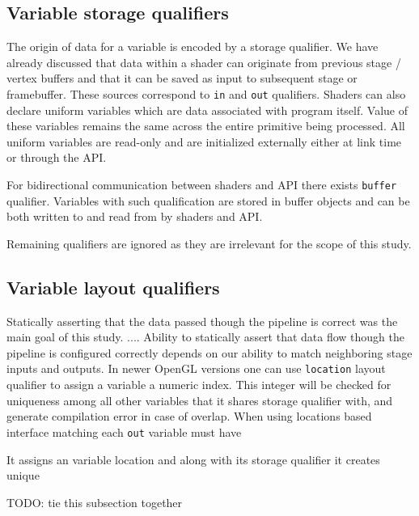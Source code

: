 \subsection{Variable storage qualifiers}

The origin of data for a variable is encoded by a storage qualifier. We have already discussed that data within a shader can originate from previous stage / vertex buffers and that it can be saved as input to subsequent stage or framebuffer.
These sources correspond to \texttt{in} and \texttt{out} qualifiers. 
Shaders can also declare uniform variables which are data associated with program itself. Value of these variables remains the same across the
entire primitive being processed. All uniform variables are read-only and are initialized externally either at link time or through the API.

For bidirectional communication between shaders and API there exists \texttt{buffer} qualifier. Variables with such qualification are stored in buffer objects and can be both written to and read from by shaders and API.

Remaining qualifiers are ignored as they are irrelevant for the scope of this study.

\subsection{Variable layout qualifiers}

Statically asserting that the data passed though the pipeline is correct was the main goal of this study.  ....
Ability to statically assert that data flow though the pipeline is configured correctly depends on our ability to match neighboring stage inputs and outputs.
In newer OpenGL versions one can use \texttt{location} layout qualifier to assign a variable a numeric index.
This integer will be checked for uniqueness among all other variables that it shares storage qualifier with, and generate compilation error in case of overlap.
When using locations based interface matching each \texttt{out} variable must have

It assigns an variable location and along with its storage qualifier it creates unique 

TODO: tie this subsection together

